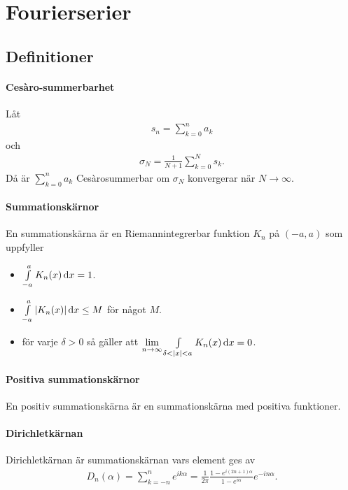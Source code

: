 \section{Fourierserier}

\subsection{Definitioner}

\paragraph{Cesàro-summerbarhet}
Låt
\begin{align*}
	s_{n} = \sum\limits_{k = 0}^{n}a_{k}
\end{align*}
och
\begin{align*}
	\sigma_{N} = \frac{1}{N + 1}\sum\limits_{k = 0}^{N}s_{k}.
\end{align*}
Då är $\sum\limits_{k = 0}^{n}a_{k}$ Cesàrosummerbar om $\sigma_{N}$ konvergerar när $N\to\infty$.

\paragraph{Summationskärnor}
En summationskärna är en Riemannintegrerbar funktion $K_{n}$ på $(-a, a)$ som uppfyller
\begin{itemize}
	\item $\int\limits_{-a}^{a}K_{n}(x)\dd{x} = 1$.
	\item $\int\limits_{-a}^{a}\abs{K_{n}(x)}\dd{x} \leq M$ för något $M$.
	\item för varje $\delta > 0$ så gäller att $\lim\limits_{n\to\infty}\int\limits_{\delta < \abs{x} < a}^{}K_{n}(x)\dd{x} = 0$.
\end{itemize}

\paragraph{Positiva summationskärnor}
En positiv summationskärna är en summationskärna med positiva funktioner.

\paragraph{Dirichletkärnan}
Dirichletkärnan är summationskärnan vars element ges av
\begin{align*}
	D_{n}(\alpha) = \sum\limits_{k = -n}^{n}e^{ik\alpha} = \frac{1}{2\pi}\frac{1 - e^{i(2n + 1)\alpha}}{1 - e^{i\alpha}}e^{-in\alpha}.
\end{align*}

